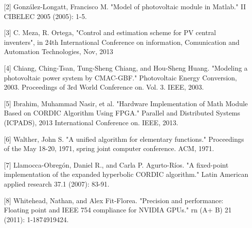[2] González-Longatt, Francisco M. "Model of photovoltaic module in Matlab." II CIBELEC 2005 (2005): 1-5.

[3] C. Meza, R. Ortega, "Control and estimation scheme for PV central inventers", in 24th International Conference on information, Comunication and Automation Technologies, Nov, 2013 

[4] Chiang, Ching-Tsan, Tung-Sheng Chiang, and Hou-Sheng Huang. "Modeling a photovoltaic power system by CMAC-GBF." Photovoltaic Energy Conversion, 2003. Proceedings of 3rd World Conference on. Vol. 3. IEEE, 2003.

[5] Ibrahim, Muhammad Nasir, et al. "Hardware Implementation of Math Module Based on CORDIC Algorithm Using FPGA." Parallel and Distributed Systems (ICPADS), 2013 International Conference on. IEEE, 2013.

[6] Walther, John S. "A unified algorithm for elementary functions." Proceedings of the May 18-20, 1971, spring joint computer conference. ACM, 1971.

[7] Llamocca-Obregón, Daniel R., and Carla P. Agurto-Ríos. "A fixed-point implementation of the expanded hyperbolic CORDIC algorithm." Latin American applied research 37.1 (2007): 83-91.

[8] Whitehead, Nathan, and Alex Fit-Florea. "Precision and performance: Floating point and IEEE 754 compliance for NVIDIA GPUs." rn (A+ B) 21 (2011): 1-1874919424.



